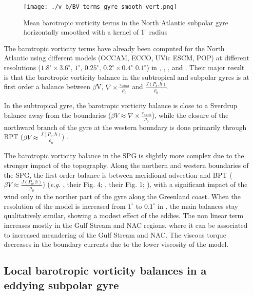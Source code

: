 \documentclass[11pt,a4paper]{article}
\begin{document}
\begin{figure}[H]
\centerline{\texttt{[image: ./v\_b/BV\_terms\_gyre\_smooth\_vert.png]}}
\caption{Mean barotropic vorticity terms in the North Atlantic subpolar gyre horizontally smoothed with a kernel of $1^{\circ}$ radius}
\label{spatial_BV}
\end{figure} 

The barotropic vorticity terms have already been computed for the North Atlantic using different models (OCCAM, ECCO, UVic ESCM, POP) at different resolutions ($1.8^{\circ}\times3.6^{\circ}$, $1^{\circ}$, $0.25^{\circ}$, $0.2^{\circ}\times 0.4^{\circ}$ $0.1^{\circ}$) in \citet{hughes2001}, \citet{spence2012}, \citet{sonnewald2019}, and \citet{yeager2015}. Their major result is that the barotropic vorticity balance in the subtropical and subpolar gyres is at first order a balance between $\beta$V, $\nabla \times \frac{\tau _{wind}}{\rho_{0}}$ and $\frac{J(P_b,h)}{\rho _0}$. 

In the subtropical gyre, the barotropic vorticity balance is close to a Sverdrup balance away from the boundaries ($\beta V \approx \nabla \times \frac{\tau _{wind}}{\rho_{0}}$), while the closure of the northward branch of the gyre at the western boundary is done primarily through BPT ($\beta V \approx \frac{J(P_b,h)}{\rho _0}$)  \citep{schoonover2016}.

The barotropic vorticity balance in the SPG is slightly more complex due to the stronger impact of the topography. Along the northern and western boundaries of the SPG, the first order balance is between meridional advection and BPT ($\beta V \approx \frac{J(P_b,h)}{\rho _0}$) (\textit{e.g.} \citet{hughes2001}, their Fig. 4; \citet{yeager2015}, their Fig. 1; ), with a significant impact of the wind only in the norther part of the gyre along the Greenland coast. When the resolution of the model is increased from $1^{\circ}$ to $0.1^{\circ}$ in \citet{yeager2015}, the main balances stay qualitatively similar, showing a modest effect of the eddies. The non linear term increases mostly in the Gulf Stream and NAC regions, where it can be associated to increased meandering of the Gulf Stream and NAC. The viscous torque decreases in the boundary currents due to the lower viscosity of the model.

\subsection{Local barotropic vorticity balances in a eddying subpolar gyre}
\end{document}
